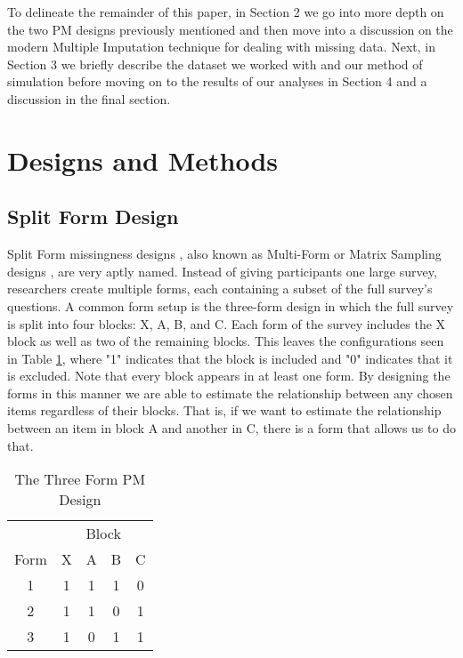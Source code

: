 \documentclass{svjour3}                     %
\begin{document}
To delineate the remainder of this paper, in Section 2 we go into more depth on the two PM designs previously mentioned and then move into a discussion on the modern Multiple Imputation technique for dealing with missing data. Next, in Section 3 we briefly describe the dataset we worked with and our method of simulation before moving on to the results of our analyses in Section 4 and a discussion in the final section. \par

\section{Designs and Methods}
\label{sec:1}
\subsection{Split Form Design}
\label{sec:1.1}

Split Form missingness designs \citep{raghunathan1995split}, also  known as Multi-Form \citep{little2013planned} or Matrix Sampling designs \citep{thomas2006evaluation}, are very aptly named. Instead of giving participants one large survey, researchers create multiple forms, each containing a subset of the full survey’s questions. A common form setup is the three-form design \citep{graham1996maximizing} in which the full survey is split into four blocks: X, A, B, and C. Each form of the survey includes the X block as well as two of the remaining blocks. This leaves the configurations seen in Table \ref{tab:table10}, where "1" indicates that the block is included and "0" indicates that it is excluded. Note that every block appears in at least one form. By designing the forms in this manner we are able to estimate the relationship between any chosen items regardless of their blocks. That is, if we want to estimate the relationship between an item in block A and another in C, there is a form that allows us to do that. \par

\begin{table}[h!]
	\centering
	\caption{The Three Form PM Design}
	\label{tab:table10}
	\setlength{\tabcolsep}{1cm}
	\begin{tabular}{c|cccc}
		\toprule
		& \multicolumn{4}{c}{Block} \\
		Form & X & A & B & C \\
		\midrule
		1 & 1 & 1 & 1 & 0 \\
		2 & 1 & 1 & 0 & 1 \\
		3 & 1 & 0 & 1 & 1 \\
		\bottomrule
	\end{tabular}
\end{table}
\end{document}
